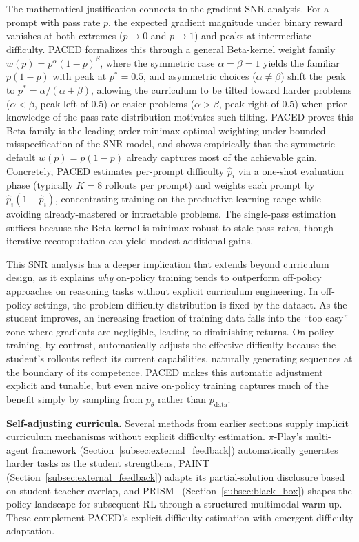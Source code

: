 \documentclass{article} %
\newcommand{\ptheta}{p_\theta}
\newcommand{\pdata}{p_{\mathrm{data}}}
\begin{document}
The mathematical justification connects to the gradient SNR analysis. For a prompt with pass rate $p$, the expected gradient magnitude under binary reward vanishes at both extremes ($p \to 0$ and $p \to 1$) and peaks at intermediate difficulty. PACED formalizes this through a general Beta-kernel weight family $w(p) = p^\alpha(1-p)^\beta$, where the symmetric case $\alpha = \beta = 1$ yields the familiar $p(1-p)$ with peak at $p^* = 0.5$, and asymmetric choices ($\alpha \neq \beta$) shift the peak to $p^* = \alpha/(\alpha + \beta)$, allowing the curriculum to be tilted toward harder problems ($\alpha < \beta$, peak left of $0.5$) or easier problems ($\alpha > \beta$, peak right of $0.5$) when prior knowledge of the pass-rate distribution motivates such tilting. PACED proves this Beta family is the leading-order minimax-optimal weighting under bounded misspecification of the SNR model, and shows empirically that the symmetric default $w(p) = p(1-p)$ already captures most of the achievable gain. Concretely, PACED estimates per-prompt difficulty $\hat{p}_i$ via a one-shot evaluation phase (typically $K{=}8$ rollouts per prompt) and weights each prompt by $\hat{p}_i (1 - \hat{p}_i)$, concentrating training on the productive learning range while avoiding already-mastered or intractable problems. The single-pass estimation suffices because the Beta kernel is minimax-robust to stale pass rates, though iterative recomputation can yield modest additional gains.

This SNR analysis has a deeper implication that extends beyond curriculum design, as it explains \emph{why} on-policy training tends to outperform off-policy approaches on reasoning tasks without explicit curriculum engineering. In off-policy settings, the problem difficulty distribution is fixed by the dataset. As the student improves, an increasing fraction of training data falls into the ``too easy'' zone where gradients are negligible, leading to diminishing returns. On-policy training, by contrast, automatically adjusts the effective difficulty because the student's rollouts reflect its current capabilities, naturally generating sequences at the boundary of its competence. PACED makes this automatic adjustment explicit and tunable, but even naive on-policy training captures much of the benefit simply by sampling from $\ptheta$ rather than $\pdata$.

\textbf{Self-adjusting curricula.} Several methods from earlier sections supply implicit curriculum mechanisms without explicit difficulty estimation. $\pi$-Play's multi-agent framework (Section~\ref{subsec:external_feedback}) automatically generates harder tasks as the student strengthens, PAINT~\citep{2604.26573} (Section~\ref{subsec:external_feedback}) adapts its partial-solution disclosure based on student-teacher overlap, and PRISM~\citep{2604.28123} (Section~\ref{subsec:black_box}) shapes the policy landscape for subsequent RL through a structured multimodal warm-up. These complement PACED's explicit difficulty estimation with emergent difficulty adaptation.
\end{document}

